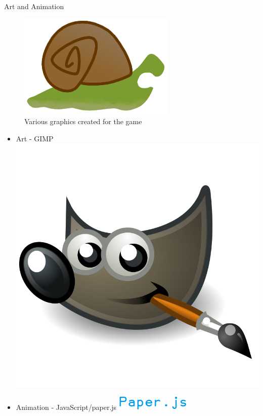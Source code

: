 \documentclass{beamer}
\begin{document}
\begin{frame}{Art and Animation}
\begin{figure}
    \includegraphics[scale=0.15]{snail_teeth.png}
    \caption{Various graphics created for the game}
  \end{figure}
  \begin{itemize}
    \item Art - GIMP
      \hfill
      \includegraphics[scale=0.025]{gimp_logo.png}
    \item Animation - JavaScript/paper.js
      \hfill
      \includegraphics[scale=0.4]{paper_logo.png}
  \end{itemize}
\end{frame}
\end{document}
